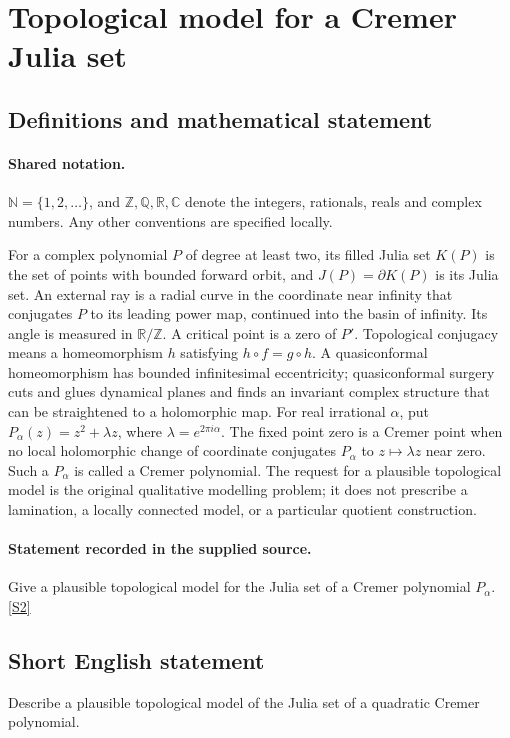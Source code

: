 \documentclass[11pt]{article}
\newcommand{\sref}[2]{\hyperlink{source:#1:#2}{[S#2]}}
\begin{document}
\section{Topological model for a Cremer Julia set}\label{statement}

\subsection{Definitions and mathematical statement}

\paragraph{Shared notation.}$\mathbb N=\{1,2,\ldots\}$, and $\mathbb Z,\mathbb Q,\mathbb R,\mathbb C$ denote the integers, rationals, reals and complex numbers. Any other conventions are specified locally.


For a complex polynomial $P$ of degree at least two, its filled Julia set $K(P)$ is the set of points with bounded forward orbit, and $J(P)=\partial K(P)$ is its Julia set. An external ray is a radial curve in the coordinate near infinity that conjugates $P$ to its leading power map, continued into the basin of infinity. Its angle is measured in $\mathbb R/\mathbb Z$. A critical point is a zero of $P'$. Topological conjugacy means a homeomorphism $h$ satisfying $h\circ f=g\circ h$. A quasiconformal homeomorphism has bounded infinitesimal eccentricity; quasiconformal surgery cuts and glues dynamical planes and finds an invariant complex structure that can be straightened to a holomorphic map.
For real irrational $\alpha$, put $P_\alpha(z)=z^2+\lambda z$, where $\lambda=e^{2\pi i\alpha}$. The fixed point zero is a Cremer point when no local holomorphic change of coordinate conjugates $P_\alpha$ to $z\mapsto\lambda z$ near zero. Such a $P_\alpha$ is called a Cremer polynomial. The request for a plausible topological model is the original qualitative modelling problem; it does not prescribe a lamination, a locally connected model, or a particular quotient construction.
\paragraph{Statement recorded in the supplied source.}
Give a plausible topological model for the Julia set of a Cremer polynomial $P_\alpha$. \sref{statement}{2}
\subsection{Short English statement}
Describe a plausible topological model of the Julia set of a quadratic Cremer polynomial.
\end{document}

